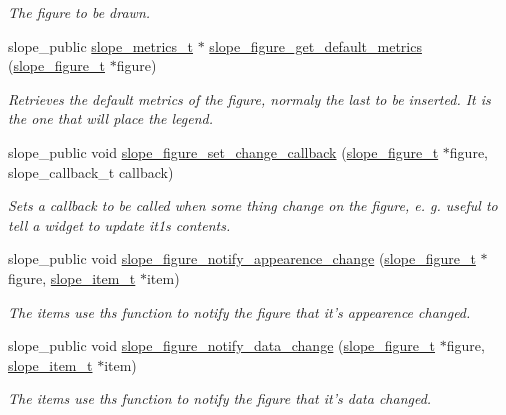 \begin{DoxyCompactItemize}
\begin{DoxyCompactList}\small\item\em The figure to be drawn. \end{DoxyCompactList}\item 
slope\+\_\+public \hyperlink{group__Metrics_gab80787ee8ae8dc449e770249fe0e3c35}{slope\+\_\+metrics\+\_\+t} $\ast$ \hyperlink{group__Figure_gae97736e589280dfdd5446500c576887a}{slope\+\_\+figure\+\_\+get\+\_\+default\+\_\+metrics} (\hyperlink{group__Figure_ga507cc82eeca8255d6c0f603ffdaeb59e}{slope\+\_\+figure\+\_\+t} $\ast$figure)
\begin{DoxyCompactList}\small\item\em Retrieves the default metrics of the figure, normaly the last to be inserted. It is the one that will place the legend. \end{DoxyCompactList}\item 
slope\+\_\+public void \hyperlink{group__Figure_gad9907caa20c827f090b140e389f3c077}{slope\+\_\+figure\+\_\+set\+\_\+change\+\_\+callback} (\hyperlink{group__Figure_ga507cc82eeca8255d6c0f603ffdaeb59e}{slope\+\_\+figure\+\_\+t} $\ast$figure, slope\+\_\+callback\+\_\+t callback)
\begin{DoxyCompactList}\small\item\em Sets a callback to be called when some thing change on the figure, e. g. useful to tell a widget to update it1s contents. \end{DoxyCompactList}\item 
slope\+\_\+public void \hyperlink{group__Figure_ga78d439a1e8d367d8961c09643e16a6a7}{slope\+\_\+figure\+\_\+notify\+\_\+appearence\+\_\+change} (\hyperlink{group__Figure_ga507cc82eeca8255d6c0f603ffdaeb59e}{slope\+\_\+figure\+\_\+t} $\ast$figure, \hyperlink{group__Item_ga2616141f0e164a876049da51ea3a8646}{slope\+\_\+item\+\_\+t} $\ast$item)
\begin{DoxyCompactList}\small\item\em The items use ths function to notify the figure that it's appearence changed. \end{DoxyCompactList}\item 
slope\+\_\+public void \hyperlink{group__Figure_ga9fdc8f75bd016087d559f3eff854bb92}{slope\+\_\+figure\+\_\+notify\+\_\+data\+\_\+change} (\hyperlink{group__Figure_ga507cc82eeca8255d6c0f603ffdaeb59e}{slope\+\_\+figure\+\_\+t} $\ast$figure, \hyperlink{group__Item_ga2616141f0e164a876049da51ea3a8646}{slope\+\_\+item\+\_\+t} $\ast$item)
\begin{DoxyCompactList}\small\item\em The items use ths function to notify the figure that it's data changed. \end{DoxyCompactList}\item 

\end{DoxyCompactItemize}
